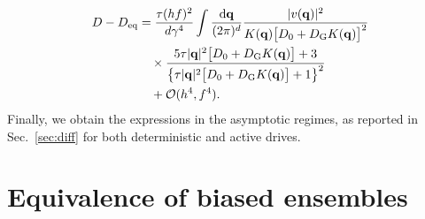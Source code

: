 \documentclass[superscriptaddress, twocolumn, prx, longbibliography, nofootinbib]{revtex4-1}
\begin{document}
\begin{equation}
	\begin{aligned}
		D - D_{\rm eq} &= \frac{\tau(hf)^2}{d\gamma^4} \int \frac{{\rm d}{\bf q}}{(2\pi)^d} \frac{|v({\bf q})|^2}{K({\bf q})\big[D_0+D_{\rm G}K({\bf q})\big]^2}
		\\
		&\quad\times \frac{5\tau|{\bf q}|^2\big[D_0+D_{\rm G}K({\bf q})\big] + 3}{ \big\{ \tau|{\bf q}|^2\big[D_0+D_{\rm G}K({\bf q})\big] + 1 \big\}^2}
		\\
		&\quad + {\cal O}(h^4,f^4) .
	\end{aligned}
\end{equation}
Finally, we obtain the expressions in the asymptotic regimes, as reported in Sec.~\ref{sec:diff} for both deterministic and active drives.




\section{Equivalence of biased ensembles}\label{app:far}
\end{document}
